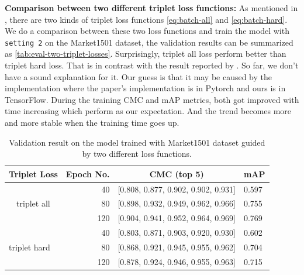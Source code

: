 \textbf{Comparison between two different triplet loss functions:}
As mentioned in \cite{in-defense-of-triplet-loss-for-reid-2017}, there are two
kinds of triplet loss functions \autoref{eq:batch-all} and
\autoref{eq:batch-hard}.
We do a comparison between these two loss functions and train the model with
\texttt{setting 2} on the Market1501 dataset, the validation results can
be summarized as \autoref{tab:eval-two-triplet-losses}. Surprisingly, triplet all loss
perform better than triplet hard loss. That is in contrast with
the result reported by \cite{in-defense-of-triplet-loss-for-reid-2017}. So far,
we don't have a sound explanation for it. Our guess is that it may be caused by
the implementation where the paper's implementation is in Pytorch and ours is
in TensorFlow.
During the training CMC and mAP metrics, both got improved with time increasing
which perform as our expectation. And the trend becomes more and more stable
when the training time goes up.

\begin{table}[]
    \centering
    \begin{tabular}{|l|r|l|l|}
        \hline
        \textbf{Triplet Loss}                     &
        \multicolumn{1}{c|}{\textbf{Epoch No.}}   &
        \multicolumn{1}{c|}{\textbf{CMC (top 5)}} &
        \multicolumn{1}{c|}{\textbf{mAP}} \\ \hline
        \multicolumn{1}{|c|}{\multirow{3}{*}{triplet all}}
        & 40  & {[}0.808, 0.877, 0.902, 0.902, 0.931{]} & 0.597
        \\ \cline{2-4}
        \multicolumn{1}{|c|}{}
        & 80  & {[}0.898, 0.932, 0.949, 0.962, 0.966{]}  & 0.755
        \\ \cline{2-4}
        \multicolumn{1}{|c|}{}
        & 120 & {[}0.904, 0.941, 0.952, 0.964, 0.969{]} & 0.769
        \\ \hline
        \multirow{3}{*}{triplet hard}
        & 40  & {[}0.803, 0.871, 0.903, 0.920, 0.930{]} & 0.602
        \\ \cline{2-4}
        & 80  & {[}0.868, 0.921, 0.945, 0.955, 0.962{]} & 0.704
        \\ \cline{2-4}
        & 120 & {[}0.878, 0.924, 0.946, 0.955, 0.963{]} & 0.715
        \\ \hline
    \end{tabular}
    \caption[Validation results on the model trained with Market1501 dataset]
    {Validation result on the model trained with Market1501 dataset guided by
        two different loss functions.}
    \label{tab:eval-two-triplet-losses}
\end{table}


